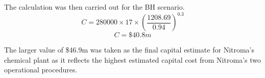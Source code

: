 The calculation was then carried out for the BH scenario.
\begin{equation}
    C=280000 \times 17 \times (\frac{1208.69}{0.94} )^0.3
\end{equation}
\begin{equation}
    C=\$40.8m
\end{equation}

The larger value of \$46.9m was taken as the final capital estimate for Nitroma's chemical plant as it reflects the highest estimated capital cost from Nitroma's two operational procedures.